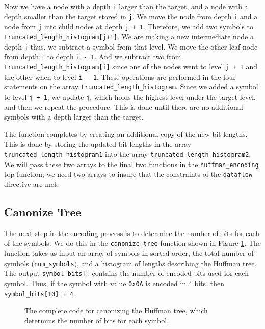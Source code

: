 Now we have a node with a depth \lstinline{i} larger than the target, and a node with a depth smaller than the target stored in \lstinline{j}. We move the node from depth \lstinline{i} and a node from \lstinline{j} into child nodes at depth \lstinline{j + 1}. Therefore, we add two symbols to \lstinline{truncated_length_histogram[j+1]}. We are making a new intermediate node a depth \lstinline{j} thus, we subtract a symbol from that level. We move the other leaf node from depth \lstinline{i} to depth \lstinline{i - 1}. And we subtract two from \lstinline{truncated_length_histogram[i]} since one of the nodes went to level \lstinline{j + 1} and the other when to level \lstinline{i - 1}. These operations are performed in the four statements on the array \lstinline{truncated_length_histogram}. Since we added a symbol to level \lstinline{j + 1}, we update \lstinline{j}, which holds the highest level under the target level, and then we repeat the procedure. This is done until there are no additional symbols with a depth larger than the target.

The function completes by creating an additional copy of the new bit lengths. This is done by storing the updated bit lengths in the array \lstinline{truncated_length_histogram1} into the array \lstinline{truncated_length_histogram2}. We will pass these two arrays to the final two functions in the \lstinline{huffman_encoding} top function; we need two arrays to insure that the constraints of the \lstinline{dataflow} directive are met.

\subsection{Canonize Tree}
\label{sec:huffman_canonize_tree}

The next step in the encoding process is to determine the number of bits for each of the symbols. We do this in the \lstinline{canonize_tree} function shown in Figure \ref{fig:huffman_canonize_tree.cpp}. The function takes as input an array of symbols in sorted order, the total number of symbols (\lstinline{num_symbols}), and a histogram of lengths describing the Huffman tree. The output \lstinline{symbol_bits[]} contains the number of encoded bits used for each symbol. Thus, if the symbol with value \lstinline{0x0A} is encoded in 4 bits, then \lstinline{symbol_bits[10] = 4}. 

\begin{figure}

\caption{ The complete code for canonizing the Huffman tree, which determins the number of bits for each symbol. }
\label{fig:huffman_canonize_tree.cpp}
\end{figure}


